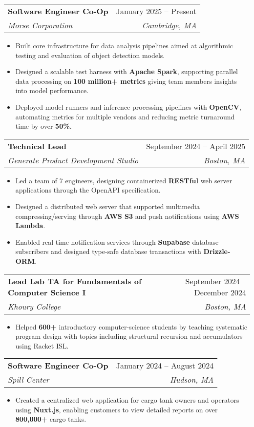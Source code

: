 \documentclass[letterpaper,11pt]{article}
\makeatletter
\newcommand{\resumeItem}[1]{
  \item\small{
    {#1 \vspace{-2pt}}
  }
}
\newcommand{\resumeSubheading}[4]{
  \vspace{-2pt}\item
    \begin{tabular*}{0.97\textwidth}[t]{l@{\extracolsep{\fill}}r}
      \textbf{#1} & #2 \\
      \textit{\small#3} & \textit{\small #4} \\
    \end{tabular*}\vspace{-7pt}
}
\newcommand{\resumeSubSubheading}[2]{
    \item
    \begin{tabular*}{0.97\textwidth}{l@{\extracolsep{\fill}}r}
      \textit{\small#1} & \textit{\small #2} \\
    \end{tabular*}\vspace{-7pt}
}
\newcommand{\resumeSubHeadingListEnd}{\end{itemize}}
\newcommand{\resumeItemListStart}{\begin{itemize}}
\newcommand{\resumeItemListEnd}{\end{itemize}\vspace{-5pt}}
\makeatother
\begin{document}
\resumeSubheading
{Software Engineer Co-Op}{January 2025 -- Present}
{Morse Corporation}{Cambridge, MA}
\resumeItemListStart
\resumeItem { Built core infrastructure for data analysis pipelines aimed at algorithmic testing and evaluation of object detection models. }
\resumeItem { Designed a scalable test harness with \textbf{Apache Spark}, supporting parallel data processing on \textbf{100 million+ metrics} giving team members insights into model performance.}
\resumeItem { Deployed model runners and inference processing pipelines with \textbf{OpenCV}, automating metrics for multiple vendors and reducing metric turnaround time by over \textbf{50\%}. }
\resumeItemListEnd


\resumeSubheading
{Technical Lead}{September 2024 -- April 2025}
{Generate Product Development Studio}{Boston, MA}
\resumeItemListStart
\resumeItem { Led a team of 7 engineers, designing containerized \textbf{RESTful} web server applications through the OpenAPI specification.}
\resumeItem{
	Designed a distributed web server that supported multimedia compressing/serving through \textbf{AWS S3} and push notifications using \textbf{AWS Lambda}.
}
\resumeItem { Enabled real-time notification services through \textbf{Supabase} database subscribers and designed type-safe database transactions with \textbf{Drizzle-ORM}.}
\resumeItemListEnd

\resumeSubheading
{Lead Lab TA for Fundamentals of Computer Science I}{September 2024 -- December 2024}
{Khoury College}{Boston, MA}
\resumeItemListStart
\resumeItem { Helped \textbf{600+} introductory computer-science students by teaching systematic program design with topics including structural recursion and accumulators using Racket ISL. }
\resumeItemListEnd

\resumeSubheading
{Software Engineer Co-Op}{January 2024 -- August 2024}
{Spill Center}{Hudson, MA}
\resumeItemListStart
\resumeItem { Created a centralized web application for cargo tank owners and operators using \textbf{Nuxt.js}, enabling customers to view detailed reports on over \textbf{800,000+} cargo tanks. }
\resumeItemListEnd
\end{document}

